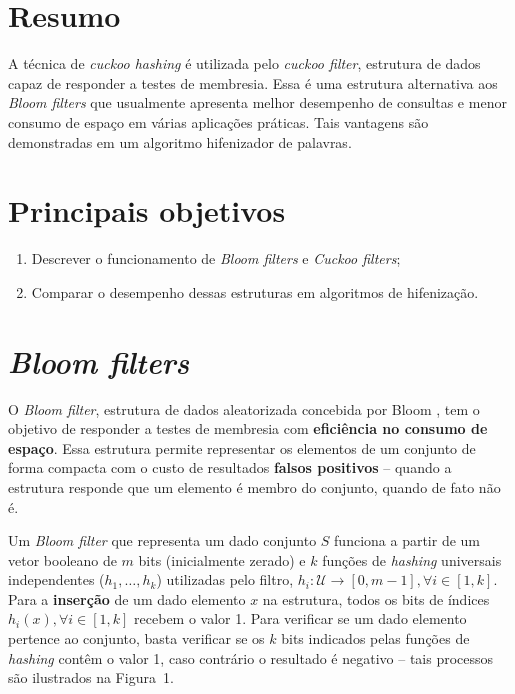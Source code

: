 \documentclass[portrait]{ppgcaposter}
\begin{document}
\begin{multicols}{2} %

  \color{black}
  
\section*{Resumo}
A técnica de \textit{cuckoo hashing} é utilizada pelo \textit{cuckoo filter}, estrutura de dados capaz de responder a testes de membresia. Essa é uma estrutura alternativa aos \textit{Bloom filters} que usualmente apresenta melhor desempenho de consultas e menor consumo de espaço em várias aplicações práticas. Tais vantagens são demonstradas em um algoritmo hifenizador de palavras.

\section*{Principais objetivos}


\begin{enumerate}
\item Descrever o funcionamento de \textit{Bloom filters} e \textit{Cuckoo filters};
\item Comparar o desempenho dessas estruturas em algoritmos de hifenização.
\end{enumerate}

\section{\textit{Bloom filters}}

O \textit{Bloom filter}, estrutura de dados aleatorizada concebida por Bloom \cite{bloom}, tem o objetivo de responder a testes de membresia com \textbf{eficiência no consumo de espaço}. Essa estrutura permite representar os elementos de um conjunto de forma compacta com o custo de resultados \textbf{falsos positivos} -- quando a estrutura responde que um elemento é membro do conjunto, quando de fato não é.

Um \textit{Bloom filter} que representa um dado conjunto $S$ funciona a partir de um vetor booleano de $m$ bits (inicialmente zerado) e $k$ funções de \textit{hashing} universais independentes ($h_1, \dots, h_k$) utilizadas pelo filtro, $h_i: \mathcal{U} \to [0, m-1], \forall i \in [1, k]$. Para a \textbf{inserção} de um dado elemento $x$ na estrutura, todos os bits de índices $h_i(x), \forall i \in [1,k]$ recebem o valor 1. Para verificar se um dado elemento pertence ao conjunto, basta verificar se os $k$ bits indicados pelas funções  de \textit{hashing} contêm o valor 1, caso contrário o resultado é negativo -- tais processos são ilustrados na Figura~1.


\end{multicols}
\end{document}
